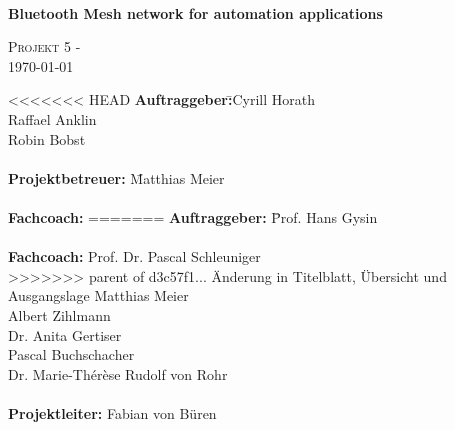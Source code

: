 \documentclass[final]{fhnwreport}       %
\begin{document}
	\begin{center}
		\vspace*{2cm}
		{\huge{\textbf{\thetitle}}}\\
		\vspace*{0.5cm}
		
		{\huge{\textbf{Bluetooth Mesh network for automation applications}}}\\
		\vspace*{0.5cm}
		
		{\scshape\Large Projekt 5 - \theauthor \\} \Large{\today}
		\vfill
		\begin{normalsize}
			{\begin{tabbing}
<<<<<<< HEAD
					\textbf{Auftraggeber:}\hspace{5cm}\= 
					\>Cyrill Horath \\ 
					\>Raffael Anklin \\ 
					\>Robin Bobst \\ 
					
					
					\\[0.8cm]
					\textbf{Projektbetreuer:} 
					\hspace{5cm}\= Matthias Meier\\
					
					\\[0.8cm]
					\textbf{Fachcoach:} 
=======
					\textbf{Auftraggeber:} \hspace{5cm}\= Prof. Hans Gysin\\
					
					\\[0.8cm]
					\textbf{Fachcoach:} 
					\>Prof. Dr. Pascal Schleuniger\\
>>>>>>> parent of d3c57f1... Änderung in Titelblatt, Übersicht und Ausgangslage
					\>Matthias Meier\\
					\>Albert Zihlmann\\
					\>Dr. Anita Gertiser\\
					\>Pascal Buchschacher\\
					\>Dr. Marie-Thérèse Rudolf von Rohr\\
					
					\\[0.4cm]
					\textbf{Projektleiter:} \>Fabian von Büren\\
					\\[0.4cm]


\end{tabbing}}
\end{normalsize}
\end{center}
\end{document}

